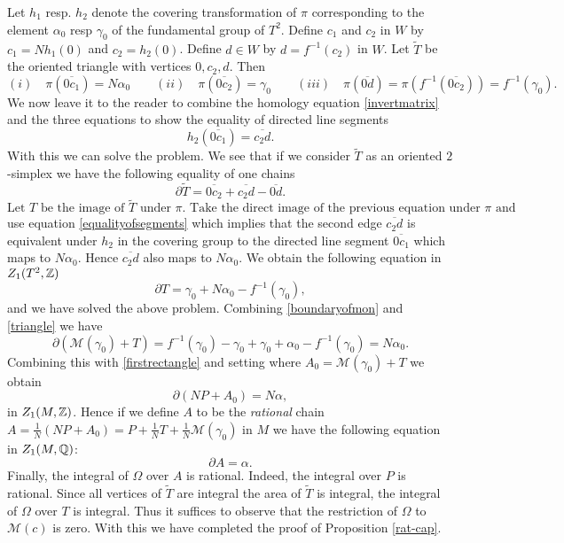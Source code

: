 Let $h_1$ resp. $h_2$ denote the covering transformation of $\pi$
corresponding to the element $\alpha_0$ resp $\gamma_0$ of the
fundamental group of $T^2$. Define $c_1$ and $c_2$ in $W$ by $c_1
= Nh_1(0)$ and $c_2=h_2(0)$. Define $d \in W$ by $d =f^{-1}(c_2)$
in $W$. Let $\widetilde{T}$ be the oriented triangle
with vertices $0,c_2,d$.  Then
 \[
 (i) \quad \pi(\overline{0c_1}) =N\alpha_0 \qquad (ii) \quad \pi(\overline{0c_2})= \gamma_0 \qquad (iii) \quad 
 \pi(\overline{0d}) = \pi(f^{-1}(\overline{0c_2})) = f^{-1}(\gamma_0).
 \]
 We now leave it to the reader to combine the homology equation
 \eqref{invertmatrix} and the three equations to show the equality
 of directed line segments
\begin{equation}\label{equalityofsegments}
h_2( \overline{0c_1}) = \overline{c_2d}.
\end{equation}
With this we can solve the problem. 
We see that if we consider $\widetilde{T}$ as an oriented $2$-simplex
we have the following equality of one chains
$$
\partial \widetilde{T} = \overline{0c_2} + \overline{c_2d} - \overline{0d}.
$$
$\text{Let $T$ be the image of $\widetilde{T}$ under $\pi$. Take
the direct image of the previous equation under $\pi$ and}$ use
equation \eqref{equalityofsegments} which implies that the second
edge $\overline{c_2d}$ is equivalent under $h_2$ in the covering
group to the directed line segment $\overline{0c_1}$ which maps to
$N\alpha_0$. Hence $\overline{c_2d}$ also maps to $N\alpha_0$. We
obtain  the following equation in $Z_1(T^2,\mathbb{Z})$
\begin{equation}\label{triangle}
\partial T =  \gamma_0 + N \alpha_0 - f^{-1}(\gamma_0),
\end{equation}
and we have solved the above problem. Combining \eqref{boundaryofmon}
and \eqref{triangle} we have
$$
\partial (\mathcal{M}(\gamma_0) + T ) = f^{-1}(\gamma_0) -\gamma_0 +\gamma_0 + \alpha_0 - f^{-1}(\gamma_0)= N\alpha_0.
$$
Combining this with \eqref{firstrectangle} and setting where $A_0 = \mathcal{M}(\gamma_0) +T$ we obtain
\begin{equation} \label{cap}
\partial (NP + A_0 ) = N \alpha,
\end{equation}
in $Z_1(M,\mathbb{Z})$. Hence if we define $A$ to be the  {\it rational}
chain $A = \frac{1}{N} (NP + A_0) = P + \frac{1}{N}T + \frac{1}{N}
\mathcal{M}(\gamma_0)$ in $M$ we have the following equation in
$Z_1(M,\mathbb{Q})$:
$$
\partial A = \alpha.
$$
Finally, the integral of $\Omega$ over $A$ is rational. Indeed, the
integral over $P$ is rational.  Since all vertices of $\widetilde{T}$
are integral the area of $\widetilde{T}$ is integral, the integral
of $\Omega$ over $T$ is integral. Thus it suffices to observe that
the restriction of $\Omega$ to $\mathcal{M}(c)$ is zero. With this
we have completed the proof of Proposition \ref{rat-cap}.

